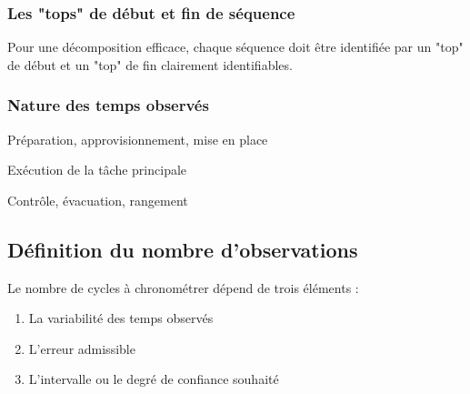 \documentclass[a4paper,12pt]{article}
\begin{document}
\subsubsection{Les "tops" de début et fin de séquence}

Pour une décomposition efficace, chaque séquence doit être identifiée par un "top" de début et un "top" de fin clairement identifiables.

\begin{center}
\end{center}

\subsubsection{Nature des temps observés}

\begin{description}[labelwidth=3.5cm]
    \item[Avant opération] Préparation, approvisionnement, mise en place
    \item[Pendant opération] Exécution de la tâche principale
    \item[Après opération] Contrôle, évacuation, rangement
\end{description}

\subsection{Définition du nombre d'observations}

Le nombre de cycles à chronométrer dépend de trois éléments :
\begin{enumerate}
    \item La variabilité des temps observés
    \item L'erreur admissible
    \item L'intervalle ou le degré de confiance souhaité
\end{enumerate}
\end{document}
